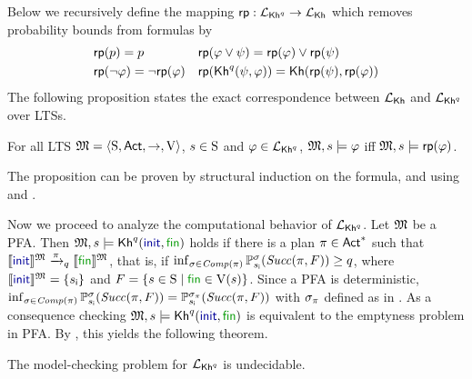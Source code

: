 Below we recursively define the mapping $\fgetprob:\PKh\to\Khlogic$ which removes probability bounds from formulas by
%
\begin{align*}
  & \fgetprob(p) = p
  && \fgetprob(\varphi \vee \psi) = \fgetprob(\varphi) \vee \fgetprob(\psi)\\
  & \fgetprob(\neg \varphi) = \neg \fgetprob(\varphi)
  && \fgetprob(\kh^q(\psi,\varphi)) = \kh(\fgetprob(\psi),\fgetprob(\varphi))
\end{align*}
%
The following proposition states the exact correspondence between
$\Khlogic$ and $\PKh$ over LTSs.
%
\begin{proposition}\label{prop:Kh:PKh}
    For all LTS $\model = \tup{\S,\Act,\ra,\V}$, $s\in\S$ and
    $\varphi\in\PKh$,
    $\model,s\models\varphi$ iff $\model,s\models\fgetprob(\varphi)$.
\end{proposition}

The proposition can be proven by structural induction on
the formula, and using
 and .

Now we proceed to analyze the computational behavior of $\PKh$. 
Let $\model$ be a PFA. Then $\model,s\models\kh^q(\init,\fin)$ holds
if there is a plan $\plan\in \Act^*$ such that
$\truthset{\model}{\init}\reach{\plan}_q\truthset{\model}{\fin}$, that
is, if
$\inf_{\strat\in\Comp(\plan)}\Prob^\strat_{s_{\textsf{i}}}(\Succ(\plan,F)) \geq q$,
where $\truthset{\model}{\init}=\{s_{\textsf{i}}\}$ and
$F=\{{s\in\S}\mid{\fin\in\V(s)}\}$.
%
Since a PFA is deterministic,
$\inf_{\strat\in\Comp(\plan)}\Prob^\strat_{s_{\textsf{i}}}(\Succ(\plan,F)) =
\Prob^{\strat_\plan}_{s_{\textsf{i}}}(\Succ(\plan,F))$
with $\strat_\plan$ defined as in .
%
As a consequence checking $\model,s\models\kh^q(\init,\fin)$ is
equivalent to the emptyness problem in PFA.  By
, this yields the following theorem.

\begin{theorem}\label{th:mc:PKh:undecidable}
  The model-checking problem for $\PKh$ is undecidable.
\end{theorem}

